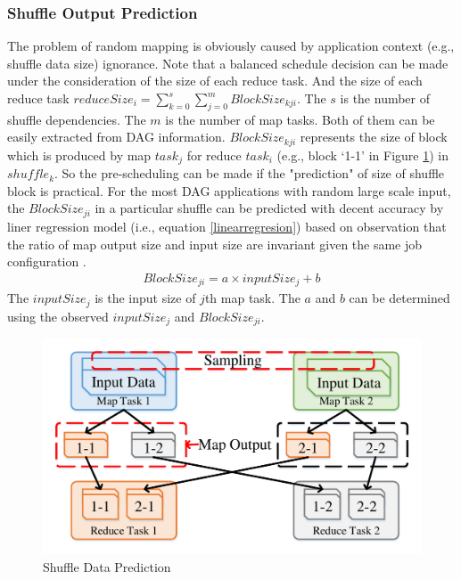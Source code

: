 \subsubsection{Shuffle Output Prediction}\label{shuffleprediction}
\ifrevision
{}
\fi
The problem of random mapping is obviously caused by application context (e.g., shuffle data size) ignorance. 
Note that a balanced schedule decision can be made under the consideration of the size of each reduce task. 
And the size of each reduce task $reduceSize_i = \sum_{k=0}^{s} \sum_{j=0}^{m} {BlockSize_{kji}}$. 
The $s$ is the number of shuffle dependencies. The $m$ is the number of map tasks. 
Both of them can be easily extracted from DAG information. 
$BlockSize_{kji}$ represents the size of block which is produced by map $task_j$ for reduce $task_i$ (e.g., block `1-1' in Figure \ref{fig:shuffle}) in $shuffle_k$.
So the pre-scheduling can be made if the "prediction" of size of shuffle block is practical.
\ifrevision
\reversemarginpar
{}
\fi
For the most DAG applications with random large scale input, 
the $BlockSize_{ji}$ in a particular shuffle can be predicted with decent accuracy by liner regression model (i.e., equation \ref{linearregresion}) based on observation that the ratio of map output size and input size are invariant given the same job configuration \cite{ishuffle, predict}.
\begin{equation}
\label{linearregresion}
\begin{aligned}
	BlockSize_{ji} = a \times inputSize_j + b
\end{aligned}
\end{equation}
The $inputSize_j$ is the input size of $j$th map task. 
The $a$ and $b$ can be determined using the observed $inputSize_j$ and $BlockSize_{ji}$.
\begin{figure}
	\centering
	\includegraphics[width=0.75\linewidth]{fig/shuffle}
	\caption{Shuffle Data Prediction}
	\label{fig:shuffle}
	\vspace{-1em}
\end{figure}
